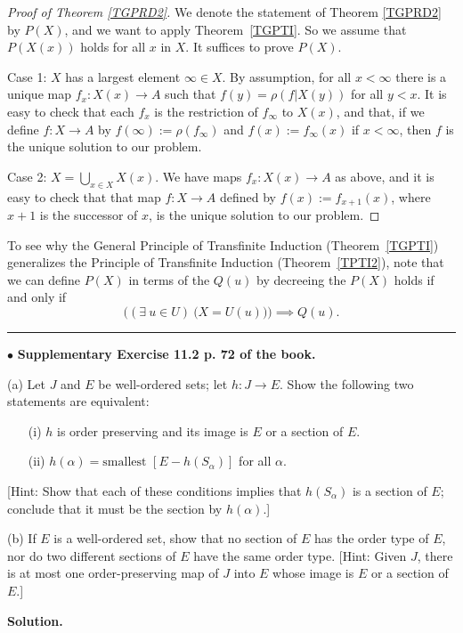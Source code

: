 \documentclass[12pt,letterpaper]{article}
\newcommand{\noi}{\noindent}%
\begin{document}
\begin{proof}[Proof of Theorem \ref{TGPRD2}] 
We denote the statement of Theorem \ref{TGPRD2} by $P(X)$, and we want to apply Theorem~\ref{TGPTI}. So we assume that $P(X(x))$ holds for all $x$ in $X$. It suffices to prove $P(X)$. 

Case 1: $X$ has a largest element $\infty\in X$. By assumption, for all $x<\infty$ there is a unique map $f_x:X(x)\to A$ such that $f(y)=\rho(f|X(y))$ for all $y<x$. It is easy to check that each $f_x$ is the restriction of $f_\infty$ to $X(x)$, and that, if we define $f:X\to A$ by $f(\infty):=\rho(f_\infty)$ and $f(x):=f_\infty(x)$ if $x<\infty$, then $f$ is the unique solution to our problem. 

Case 2: $X=\bigcup_{x\in X}X(x)$. We have maps $f_x:X(x)\to A$ as above, and it is easy to check that that map $f:X\to A$ defined by $f(x):=f_{x+1}(x)$, where $x+1$ is the successor of $x$, is the unique solution to our problem. 
\end{proof} 

To see why the General Principle of Transfinite Induction (Theorem~\ref{TGPTI}) generalizes the Principle of Transfinite Induction (Theorem~\ref{TPTI2}), note that we can define $P(X)$ in terms of the $Q(u)$ by decreeing the $P(X)$ holds if and only if 
$$
\Big((\exists\ u\in U)\ \big(X=U(u)\big)\Big)\implies Q(u).
$$ \hrule\medskip

\noi$\bullet$ \textbf{Supplementary Exercise 11.2 p. 72 of the book.} 

\noi(a) Let $J$ and $E$ be well-ordered sets; let $h: J \to E$. Show the following two statements are equivalent:
\begin{enumerate}
    \item[(i)] $h$ is order preserving and its image is $E$ or a section of $E$.
    \item[(ii)] $h(\alpha) = \text{smallest }[E - h(S_\alpha)]$ for all $\alpha$.
\end{enumerate}
[Hint: Show that each of these conditions implies that $h(S_\alpha)$ is a section of $E$; conclude that it must be the section by $h(\alpha)$.]

\noindent (b) If $E$ is a well-ordered set, show that no section of $E$ has the order type of $E$, nor do two different sections of $E$ have the same order type. [Hint: Given $J$, there is at most one order-preserving map of $J$ into $E$ whose image is $E$ or a section of $E$.] 

\noi\textbf{Solution.} 
\end{document}
